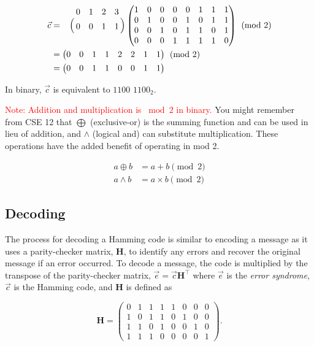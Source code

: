 \documentclass[11pt]{article}
\begin{document}
\begin{align*}
    \Vec{c} &=
        \bordermatrix{~ & 0 & 1 & 2 & 3 \cr
        ~ & 0 & 0 & 1 & 1 \cr} 
    \begin{pmatrix}
    1 & 0 & 0 & 0 & 0 & 1 & 1 & 1 \\
    0 & 1 & 0 & 0 & 1 & 0 & 1 & 1 \\
    0 & 0 & 1 & 0 & 1 & 1 & 0 & 1 \\
    0 & 0 & 0 & 1 & 1 & 1 & 1 & 0
  \end{pmatrix} \pmod{2} \\
   &= \begin{pmatrix}0 & 0 & 1 & 1 & 2 & 2 & 1 & 1\end{pmatrix} \pmod{2} \\
   &=\begin{pmatrix}0 & 0 & 1 & 1 & 0 & 0 & 1 & 1\end{pmatrix}
\end{align*}

\noindent In binary, $\Vec{c}$ is equivalent to $1100$ $1100_2$.

\textcolor{red}{Note: Addition and multiplication is $\bmod{2}$ in binary.} 
You might remember from CSE 12 that $\bigoplus$ (exclusive-or) is
the summing function and can be used in lieu of addition, and $\wedge$ (logical and) can
substitute multiplication. These operations have the added benefit of operating in mod 2.

\begin{equation*}
    \begin{split}
        a \oplus b &= a + b \pmod{2} \\
        a \wedge b &= a \times b \pmod{2}
    \end{split}
\end{equation*}

\subsection{Decoding} 
The process for decoding a Hamming code is similar to encoding a message as it uses a parity-checker matrix, $\boldsymbol{H}$, to identify any errors and recover the original message if an error occurred. 
To decode a message, the code is multiplied by the transpose of the parity-checker matrix, 
$\Vec{e} = \Vec{c}\boldsymbol{H^\intercal}$ where $\Vec{e}$ is the \emph{error syndrome},
$\Vec{c}$ is the Hamming code, and $\boldsymbol{H}$ is defined as

\begin{equation*}
  \boldsymbol{H} = 
  \begin{pmatrix}
    0 & 1 & 1 & 1 & 1 & 0 & 0 & 0 \\
    1 & 0 & 1 & 1 & 0 & 1 & 0 & 0 \\
    1 & 1 & 0 & 1 & 0 & 0 & 1 & 0 \\
    1 & 1 & 1 & 0 & 0 & 0 & 0 & 1
  \end{pmatrix}.
\end{equation*}
\end{document}
